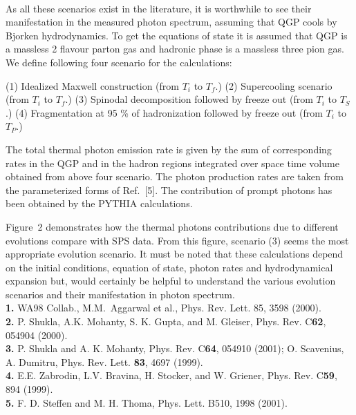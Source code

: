 \begin{figure}[!htb]
\centerline{\hbox{ 
}}
\end{figure} 

  As all these scenarios exist in the literature, it is worthwhile 
to see their manifestation in the measured photon spectrum,
assuming that QGP cools by Bjorken hydrodynamics. 
To get the equations of state it is assumed that QGP is a massless 
2 flavour parton gas and hadronic phase is a massless three 
pion gas.
We define following four scenario for the calculations:


(1) Idealized Maxwell construction (from $T_i$ to $T_f$.)
(2) Supercooling scenario (from $T_i$ to $T_f$.)
(3) Spinodal decomposition followed by freeze out
             (from $T_i$ to $T_S$.)
(4) Fragmentation at 95 \% of hadronization followed by freeze out
               (from $T_i$ to $T_P$.)

  The total thermal photon emission rate is given by the sum of 
corresponding rates in the QGP and in the hadron regions integrated 
over space time volume obtained from above four scenario. The photon 
production rates are taken from the parameterized forms of Ref.~[5].
The contribution of prompt photons has been obtained by the PYTHIA
calculations.

   Figure~2 demonstrates how the thermal photons contributions due to 
different evolutions compare with SPS data. 
From this figure, scenario (3) seems the most appropriate evolution scenario. 
 It must be noted that these calculations depend on the initial conditions, 
equation of state, photon rates and hydrodynamical expansion but, would 
certainly be helpful to understand the various evolution scenarios and their 
manifestation in photon spectrum.\\

\noindent
{\bf 1.} WA98 Collab., M.M.\ Aggarwal et al., 
            Phys. Rev. Lett. 85, 3598 (2000).\\
{\bf 2.} P. Shukla, A.K. Mohanty, S. K. Gupta, and M. Gleiser,
              Phys. Rev. C{\bf 62}, 054904 (2000).\\
{\bf 3.} P. Shukla and A. K. Mohanty, Phys. Rev. C{\bf 64},
        054910 (2001); O. Scavenius, A. Dumitru, 
        Phys. Rev. Lett. {\bf 83}, 4697 (1999).\\
{\bf 4.} E.E. Zabrodin, L.V. Bravina, H. Stocker, and W. Griener,
         Phys. Rev. C{\bf 59}, 894 (1999).\\
{\bf 5.} F. D. Steffen and M. H. Thoma, Phys. Lett. B510, 
               1998 (2001).\\

